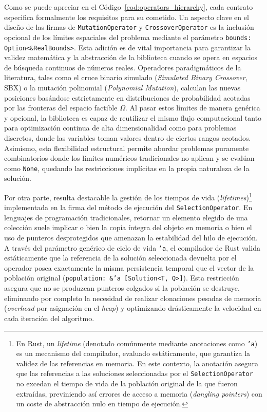 \documentclass[12pt,a4paper,twoside,openright]{book}
\begin{document}
        Como se puede apreciar en el Código~\ref{cod:operators_hierarchy}, cada contrato especifica formalmente los requisitos para su cometido. Un aspecto clave en el diseño de las firmas de \texttt{MutationOperator} y \texttt{CrossoverOperator} es la inclusión opcional de los límites espaciales del problema mediante el parámetro \texttt{bounds: Option<\&RealBounds>}. Esta adición es de vital importancia para garantizar la validez matemática y la abstracción de la biblioteca cuando se opera en espacios de búsqueda continuos de números reales. Operadores paradigmáticos de la literatura, tales como el cruce binario simulado (\textit{Simulated Binary Crossover}, SBX) o la mutación polinomial (\textit{Polynomial Mutation}), calculan las nuevas posiciones basándose estrictamente en distribuciones de probabilidad acotadas por las fronteras del espacio factible $\Omega$. Al pasar estos límites de manera genérica y opcional, la biblioteca es capaz de reutilizar el mismo flujo computacional tanto para optimización continua de alta dimensionalidad como para problemas discretos, donde las variables toman valores dentro de ciertos rangos acotados. Asimismo, esta flexibilidad estructural permite abordar problemas puramente combinatorios donde los límites numéricos tradicionales no aplican y se evalúan como \texttt{None}, quedando las restricciones implícitas en la propia naturaleza de la solución.
        
        Por otra parte, resulta destacable la gestión de los tiempos de vida (\textit{lifetimes})\footnote{En Rust, un \textit{lifetime} (denotado comúnmente mediante anotaciones como \texttt{'a}) es un mecanismo del compilador, evaluado estáticamente, que garantiza la validez de las referencias en memoria. En este contexto, la anotación asegura que las referencias a las soluciones seleccionadas por el \texttt{SelectionOperator} no excedan el tiempo de vida de la población original de la que fueron extraídas, previniendo así errores de acceso a memoria (\textit{dangling pointers}) con un coste de abstracción nulo en tiempo de ejecución.} implementada en la firma del método de ejecución del \texttt{SelectionOperator}. En lenguajes de programación tradicionales, retornar un elemento elegido de una colección suele implicar o bien la copia íntegra del objeto en memoria o bien el uso de punteros desprotegidos que amenazan la estabilidad del hilo de ejecución. A través del parámetro genérico de ciclo de vida \texttt{'a}, el compilador de Rust valida estáticamente que la referencia de la solución seleccionada devuelta por el operador posea exactamente la misma persistencia temporal que el vector de la población original (\texttt{population: \&'a [Solution<T, Q>]}). Esta restricción asegura que no se produzcan punteros colgados si la población se destruye, eliminando por completo la necesidad de realizar clonaciones pesadas de memoria (\textit{overhead} por asignación en el \textit{heap}) y optimizando drásticamente la velocidad en cada iteración del algoritmo.
\end{document}

